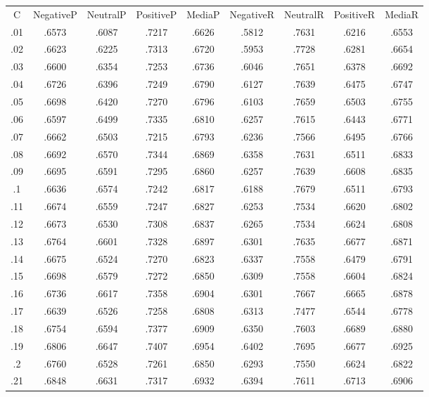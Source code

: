 \documentclass[a4paper,10pt]{article} %
\begin{document}
\begin{tabular} {ccccccccc}
    C & NegativeP & NeutralP & PositiveP & MediaP & NegativeR & NeutralR & PositiveR & MediaR \\
    .01  & .6573 & .6087 & .7217 & .6626 & .5812 & .7631 & .6216 & .6553  \\
    .02  & .6623 & .6225 & .7313 & .6720 & .5953 & .7728 & .6281 & .6654  \\
    .03  & .6600 & .6354 & .7253 & .6736 & .6046 & .7651 & .6378 & .6692  \\
    .04  & .6726 & .6396 & .7249 & .6790 & .6127 & .7639 & .6475 & .6747  \\
    .05  & .6698 & .6420 & .7270 & .6796 & .6103 & .7659 & .6503 & .6755  \\
    .06  & .6597 & .6499 & .7335 & .6810 & .6257 & .7615 & .6443 & .6771  \\
    .07  & .6662 & .6503 & .7215 & .6793 & .6236 & .7566 & .6495 & .6766  \\
    .08  & .6692 & .6570 & .7344 & .6869 & .6358 & .7631 & .6511 & .6833  \\
    .09  & .6695 & .6591 & .7295 & .6860 & .6257 & .7639 & .6608 & .6835  \\
    .1  & .6636 & .6574 & .7242 & .6817 & .6188 & .7679 & .6511 & .6793  \\
    .11  & .6674 & .6559 & .7247 & .6827 & .6253 & .7534 & .6620 & .6802  \\
    .12  & .6673 & .6530 & .7308 & .6837 & .6265 & .7534 & .6624 & .6808  \\
    .13  & .6764 & .6601 & .7328 & .6897 & .6301 & .7635 & .6677 & .6871  \\
    .14  & .6675 & .6524 & .7270 & .6823 & .6337 & .7558 & .6479 & .6791  \\
    .15  & .6698 & .6579 & .7272 & .6850 & .6309 & .7558 & .6604 & .6824  \\
    .16  & .6736 & .6617 & .7358 & .6904 & .6301 & .7667 & .6665 & .6878  \\
    .17  & .6639 & .6526 & .7258 & .6808 & .6313 & .7477 & .6544 & .6778  \\
    .18  & .6754 & .6594 & .7377 & .6909 & .6350 & .7603 & .6689 & .6880  \\
    .19  & .6806 & .6647 & .7407 & .6954 & .6402 & .7695 & .6677 & .6925  \\
    .2  & .6760 & .6528 & .7261 & .6850 & .6293 & .7550 & .6624 & .6822  \\
    .21  & .6848 & .6631 & .7317 & .6932 & .6394 & .7611 & .6713 & .6906  \\

\end{tabular}
\end{document}
